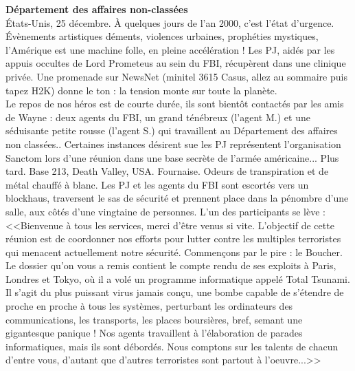 \documentclass[11pt,twoside,a4paper]{book}
\begin{document}
\textbf{\large D{\'e}partement des affaires non-class{\'e}es}~\\

{\'E}tats-Unis, 25 d{\'e}cembre. {\`A} quelques jours de l'an 2000, c'est l'{\'e}tat d'urgence. {\'E}v{\`e}nements artistiques d{\'e}ments, violences urbaines, proph{\'e}ties mystiques, l'Am{\'e}rique est une machine folle, en pleine acc{\'e}l{\'e}ration ! Les PJ, aid{\'e}s par les appuis occultes de Lord Prometeus au sein du FBI, r{\'e}cup{\`e}rent dans une clinique priv{\'e}e. Une promenade sur NewsNet (minitel 3615 Casus, allez au sommaire puis tapez H2K) donne le ton : la tension monte sur toute la plan{\`e}te.~\\

Le repos de nos h{\'e}ros est de courte dur{\'e}e, ils sont bient{\^o}t contact{\'e}s par les amis de Wayne : deux agents du FBI, un grand t{\'e}n{\'e}breux (l'agent M.) et une s{\'e}duisante petite rousse (l'agent S.) qui travaillent au D{\'e}partement des affaires non class{\'e}es.. Certaines instances d{\'e}sirent sue les PJ repr{\'e}sentent l'organisation Sanctom lors d'une r{\'e}union dans une base secr{\`e}te de l'arm{\'e}e am{\'e}ricaine... Plus tard. Base 213, Death Valley, USA. Fournaise. Odeurs de transpiration et de m{\'e}tal chauff{\'e} {\`a} blanc. Les PJ et les agents du FBI sont escort{\'e}s vers un blockhaus, traversent le sas de s{\'e}curit{\'e} et prennent place dans la p{\'e}nombre d'une salle, aux c{\^o}t{\'e}s d'une vingtaine de personnes. L'un des participants se l{\`e}ve : <<Bienvenue {\`a} tous les services, merci d'{\^e}tre venus si vite. L'objectif de cette r{\'e}union est de coordonner nos efforts pour lutter contre les multiples terroristes qui menacent actuellement notre s{\'e}curit{\'e}. Commen\c{c}ons par le pire : le Boucher. Le dossier qu'on vous a remis contient le compte rendu de ses exploits {\`a} Paris, Londres et Tokyo, o{\`u} il a vol{\'e} un programme informatique appel{\'e} Total Tsunami. Il s'agit du plus puissant virus jamais con\c{c}u, une bombe capable de s'{\'e}tendre de proche en proche {\`a} tous les syst{\`e}mes, perturbant les ordinateurs des communications, les transports, les places boursi{\`e}res, bref, semant une gigantesque panique ! Nos agents travaillent {\`a} l'{\'e}laboration de parades informatiques, mais ils sont d{\'e}bord{\'e}s. Nous comptons sur les talents de chacun d'entre vous, d'autant que d'autres terroristes sont partout {\`a} l'oeuvre...>>~\\
\end{document}
